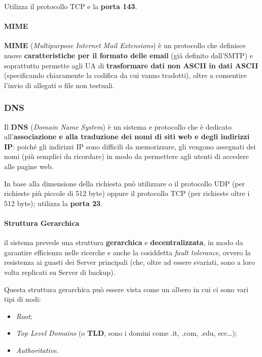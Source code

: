 \documentclass[a4paper]{article}
\begin{document}
						Utilizza il protocollo TCP e la \textbf{porta 143}.
						
				
				\paragraph{MIME}
					\textbf{MIME} (\emph{Multipurpose Internet Mail Extensions}) è un protocollo che definisce nuove \textbf{caratteristiche per il formato delle email} (già definito dall'SMTP) e soprattutto permette agli UA di \textbf{trasformare dati non ASCII in dati ASCII} (specificando chiaramente la codifica da cui vanno tradotti), oltre a consentire l'invio di allegati o file non testuali.						
		
				\newpage
		
		
		\subsubsection{DNS}
		
			Il \textbf{DNS} (\emph{Domain Name System}) è un sistema e protocollo che è dedicato all'\textbf{associazione e alla traduzione dei nomi di siti web e degli indirizzi IP}: poiché gli indirizzi IP sono difficili da memorizzare, gli vengono assegnati dei nomi (più semplici da ricordare) in modo da permettere agli utenti di accedere alle pagine web.
			
			In base alla dimensione della richiesta può utilizzare o il protocollo UDP (per richieste più piccole di 512 byte) oppure il protocollo TCP (per richieste oltre i 512 byte); utilizza la \textbf{porta 23}.	
			
			\paragraph{Struttura Gerarchica}
				il sistema prevede una struttura \textbf{gerarchica} e \textbf{decentralizzata}, in modo da garantire efficienza nelle ricerche e anche la 	cosiddetta \emph{fault tolerance}, ovvero la resistenza ai guasti dei Server principali (che, oltre ad essere svariati, sono a loro volta replicati su Server di backup).
			
				Questa struttura gerarchica può essere vista come un albero in cui ci sono vari tipi di nodi:
				\begin{itemize}
					\item \emph{Root};
					\item \emph{Top Level Domains} (o \textbf{TLD}, sono i domini come .it, .com, .edu, ecc\dots);
					\item \emph{Authoritative}.
				\end{itemize}
			
\end{document}
